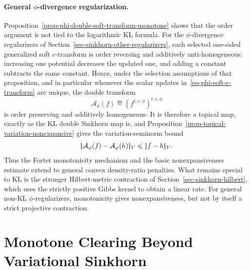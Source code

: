\paragraph{General $\phi$-divergence regularization.}
Proposition~\ref{prop-phi-double-soft-transform-monotone} shows that the order argument is not tied to the logarithmic KL formula. For the $\phi$-divergence regularizers of Section~\ref{sec-sinkhorn-other-regularizers}, each selected one-sided generalized soft $c$-transform is order reversing and additively anti-homogeneous: increasing one potential decreases the updated one, and adding a constant subtracts the same constant. Hence, under the selection assumptions of that proposition, and in particular whenever the scalar updates in~\eqref{eq-phi-soft-c-transform} are unique, the double transform
\[
	\mathcal A_\phi(f)\eqdef(f^{c,\epsilon,\phi})^{\bar c,\epsilon,\phi}
\]
is order preserving and additively homogeneous. It is therefore a topical map, exactly as the KL double Sinkhorn map is, and Proposition~\ref{prop-topical-variation-nonexpansive} gives the variation-seminorm bound
\[
	|\!| \mathcal A_\varphi(f)-\mathcal A_\varphi(h) |\!|_V
	\leqslant
	|\!| f-h |\!|_V .
\]
Thus the Fortet monotonicity mechanism and the basic nonexpansiveness estimate extend to general convex density-ratio penalties. What remains special to KL is the stronger Hilbert-metric contraction of Section~\ref{sec-sinkhorn-hilbert}, which uses the strictly positive Gibbs kernel to obtain a linear rate. For general non-KL $\phi$-regularizers, monotonicity gives nonexpansiveness, but not by itself a strict projective contraction.



\section{Monotone Clearing Beyond Variational Sinkhorn}
\label{sec-mfunction-scaling}

